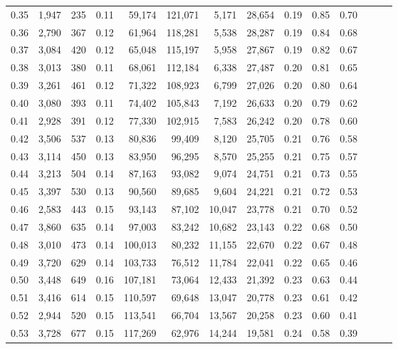 \begin{tabular}{rrrrrrrrrrrrrr}
0.35 &  1,947 &  235 &  0.11 &   59,174 &  121,071 &   5,171 &  28,654 &  0.19 &  0.85 &      0.70 \\
0.36 &  2,790 &  367 &  0.12 &   61,964 &  118,281 &   5,538 &  28,287 &  0.19 &  0.84 &      0.68 \\
0.37 &  3,084 &  420 &  0.12 &   65,048 &  115,197 &   5,958 &  27,867 &  0.19 &  0.82 &      0.67 \\
0.38 &  3,013 &  380 &  0.11 &   68,061 &  112,184 &   6,338 &  27,487 &  0.20 &  0.81 &      0.65 \\
0.39 &  3,261 &  461 &  0.12 &   71,322 &  108,923 &   6,799 &  27,026 &  0.20 &  0.80 &      0.64 \\
0.40 &  3,080 &  393 &  0.11 &   74,402 &  105,843 &   7,192 &  26,633 &  0.20 &  0.79 &      0.62 \\
0.41 &  2,928 &  391 &  0.12 &   77,330 &  102,915 &   7,583 &  26,242 &  0.20 &  0.78 &      0.60 \\
0.42 &  3,506 &  537 &  0.13 &   80,836 &   99,409 &   8,120 &  25,705 &  0.21 &  0.76 &      0.58 \\
0.43 &  3,114 &  450 &  0.13 &   83,950 &   96,295 &   8,570 &  25,255 &  0.21 &  0.75 &      0.57 \\
0.44 &  3,213 &  504 &  0.14 &   87,163 &   93,082 &   9,074 &  24,751 &  0.21 &  0.73 &      0.55 \\
0.45 &  3,397 &  530 &  0.13 &   90,560 &   89,685 &   9,604 &  24,221 &  0.21 &  0.72 &      0.53 \\
0.46 &  2,583 &  443 &  0.15 &   93,143 &   87,102 &  10,047 &  23,778 &  0.21 &  0.70 &      0.52 \\
0.47 &  3,860 &  635 &  0.14 &   97,003 &   83,242 &  10,682 &  23,143 &  0.22 &  0.68 &      0.50 \\
0.48 &  3,010 &  473 &  0.14 &  100,013 &   80,232 &  11,155 &  22,670 &  0.22 &  0.67 &      0.48 \\
0.49 &  3,720 &  629 &  0.14 &  103,733 &   76,512 &  11,784 &  22,041 &  0.22 &  0.65 &      0.46 \\
0.50 &  3,448 &  649 &  0.16 &  107,181 &   73,064 &  12,433 &  21,392 &  0.23 &  0.63 &      0.44 \\
0.51 &  3,416 &  614 &  0.15 &  110,597 &   69,648 &  13,047 &  20,778 &  0.23 &  0.61 &      0.42 \\
0.52 &  2,944 &  520 &  0.15 &  113,541 &   66,704 &  13,567 &  20,258 &  0.23 &  0.60 &      0.41 \\
0.53 &  3,728 &  677 &  0.15 &  117,269 &   62,976 &  14,244 &  19,581 &  0.24 &  0.58 &      0.39 \\

\end{tabular}
